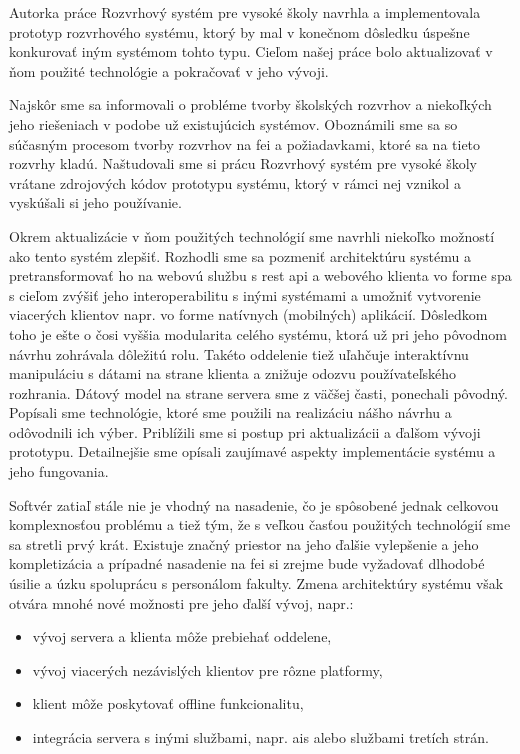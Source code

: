 Autorka práce Rozvrhový systém pre vysoké školy navrhla a implementovala
prototyp rozvrhového systému, ktorý by mal v konečnom dôsledku úspešne
konkurovať iným systémom tohto typu. \cite{knap} Cieľom našej práce bolo
aktualizovať v ňom použité technológie a pokračovať v jeho vývoji.

Najskôr sme sa informovali o probléme tvorby školských rozvrhov a niekoľkých
jeho riešeniach v podobe už existujúcich systémov. Oboznámili sme sa so súčasným
procesom tvorby rozvrhov na \acrshort{fei} a požiadavkami, ktoré sa na tieto
rozvrhy kladú. Naštudovali sme si prácu Rozvrhový systém pre vysoké školy
vrátane zdrojových kódov prototypu systému, ktorý v rámci nej vznikol a
vyskúšali si jeho používanie.

Okrem aktualizácie v ňom použitých technológií sme navrhli niekoľko možností ako
tento systém zlepšiť. Rozhodli sme sa pozmeniť architektúru systému a
pretransformovať ho na webovú službu s \acrshort{rest} \acrshort{api} a webového
klienta vo forme \acrshort{spa} s cieľom zvýšiť jeho interoperabilitu s inými
systémami a umožniť vytvorenie viacerých klientov napr. vo forme natívnych
(mobilných) aplikácií. Dôsledkom toho je ešte o čosi vyššia modularita celého
systému, ktorá už pri jeho pôvodnom návrhu zohrávala dôležitú rolu. Takéto
oddelenie tiež uľahčuje interaktívnu manipuláciu s dátami na strane klienta a
znižuje odozvu používateľského rozhrania. Dátový model na strane servera sme z
väčšej časti, ponechali pôvodný. Popísali sme technológie, ktoré sme použili na
realizáciu nášho návrhu a odôvodnili ich výber. Priblížili sme si postup pri
aktualizácii a ďalšom vývoji prototypu. Detailnejšie sme opísali zaujímavé
aspekty implementácie systému a jeho fungovania.

Softvér zatiaľ stále nie je vhodný na nasadenie, čo je spôsobené jednak celkovou
komplexnosťou problému a tiež tým, že s veľkou časťou použitých technológií sme
sa stretli prvý krát. Existuje značný priestor na jeho ďalšie vylepšenie a jeho
kompletizácia a prípadné nasadenie na \acrshort{fei} si zrejme bude vyžadovať
dlhodobé úsilie a úzku spoluprácu s personálom fakulty. Zmena architektúry
systému však otvára mnohé nové možnosti pre jeho ďalší vývoj, napr.:

\begin{itemize}
\item vývoj servera a klienta môže prebiehať oddelene,
\item vývoj viacerých nezávislých klientov pre rôzne platformy,
\item klient môže poskytovať offline funkcionalitu,
\item integrácia servera s inými službami, napr. \acrshort{ais} alebo službami
  tretích strán.
\end{itemize}
